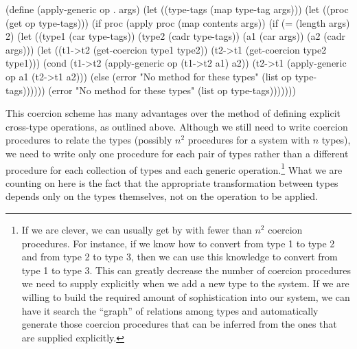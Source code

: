 \begin{codeBlock}
(define (apply-generic op . args)
  (let ((type-tags (map type-tag args)))
    (let ((proc (get op type-tags)))
      (if proc
          (apply proc (map contents args))
          (if (= (length args) 2)
              (let ((type1 (car type-tags))
                    (type2 (cadr type-tags))
                    (a1 (car args))
                    (a2 (cadr args)))
                (let ((t1->t2
                        (get-coercion type1
                                      type2))
                      (t2->t1
                        (get-coercion type2
                                      type1)))
                  (cond (t1->t2
                          (apply-generic op
                                         (t1->t2 a1)
                                         a2))
                        (t2->t1
                          (apply-generic op
                                         a1
                                         (t2->t1 a2)))
                        (else
                          (error
                            "No method for these types"
                            (list op
                                  type-tags))))))
              (error "No method for these types"
                     (list op type-tags)))))))
\end{codeBlock}

\noindent
This coercion scheme has many advantages over the method of defining explicit
cross-type operations, as outlined above.  Although we still need to write
coercion procedures to relate the types (possibly \( n^2 \) procedures for a
system with \( n \) types), we need to write only one procedure for each pair of
types rather than a different procedure for each collection of types and each
generic operation.\footnote{If we are clever, we can usually get by with fewer
than \( n^2 \) coercion procedures.  For instance, if we know how to convert from
type 1 to type 2 and from type 2 to type 3, then we can use this knowledge to
convert from type 1 to type 3.  This can greatly decrease the number of
coercion procedures we need to supply explicitly when we add a new type to the
system.  If we are willing to build the required amount of sophistication into
our system, we can have it search the ``graph'' of relations among types and
automatically generate those coercion procedures that can be inferred from the
ones that are supplied explicitly.}  What we are counting on here is the fact
that the appropriate transformation between types depends only on the types
themselves, not on the operation to be applied.

